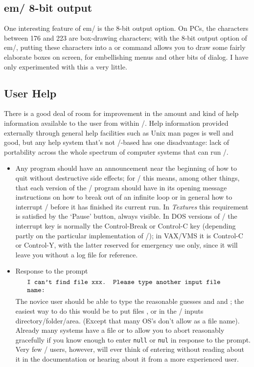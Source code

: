 {

\subsection{em\tex/ 8-bit output}\label{ss:8bit}
One interesting feature of em\tex/ \cite{emtex} is the 8-bit output
option. On PCs, the characters between 176 and 223 are box-drawing
characters; with the 8-bit output option of em\tex/, putting these
characters into a  or  command allows you to
draw some fairly elaborate boxes on screen, for embellishing menus and
other bits of dialog. I have only experimented with this a very little.

\subsection{User Help}
There is a good deal of room for improvement in the amount and
kind of help information available to the user from within \tex/.
Help information provided externally through general help facilities
such as Unix man pages is well and good, but any help system
that's not \tex/-based has one disadvantage: lack of
portability across the whole spectrum of computer systems that
can run \tex/.

\begin{itemize} \item Any program should have an announcement near
the beginning of how to quit without destructive side effects; for
\tex/ this means, among other things, that each version of the \tex/
program should have in its opening message instructions on how to
break out of an infinite loop or in general how to interrupt \tex/
before it has finished its current run. In {\it Textures\/} this
requirement is satisfied by the `Pause' button, always visible. In
DOS versions of \tex/ the interrupt key is normally the
Control-Break or Control-C key  (depending partly on the particular implementation
of \tex/); in VAX/VMS it is Control-C or Control-Y, with the latter
reserved for emergency use only, since it will leave you without a
log file for reference.

\item Response to the prompt
\[\parbox{.9\columnwidth}{\tt\raggedright
I can't find file xxx. Please type another input file name:\endgraf}\]
The novice user should be able to type the
reasonable guesses  and  and ; the easiest way
to do this would be to put files ,  or
 in the \tex/ inputs directory/folder/area. (Except that
many OS's don't allow  as a file name). Already many
systems have a file  or  to allow you to
abort reasonably gracefully if you know enough to enter {\tt null} or
{\tt nul} in response to the prompt.  Very
few \tex/ users, however, will ever think of entering  without reading
about it in the documentation or hearing about it from a more
experienced user.


\end{itemize}}

